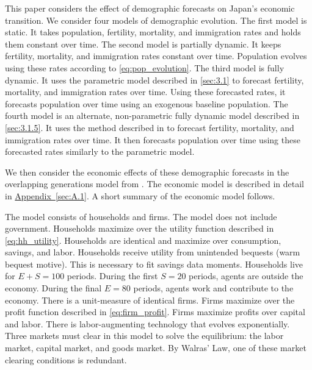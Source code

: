 \documentclass[10pt]{article}
\renewcommand{\thesection}{\arabic{section}}
\renewcommand{\thesubsection}{\thesection.\arabic{subsection}}
\newcommand{\aref}[1]{\hyperref[#1]{Appendix~\ref{#1}}}
\renewcommand{\subsection}[2][]{\oldsubsection[#1]{#2}\index{#1}\label{sec:\thesubsection}}
\numberwithin{equation}{subsection}
\begin{document}
\par This paper considers the effect of demographic forecasts on Japan's economic transition. We consider four models of demographic evolution. The first model is static. It takes population, fertility, mortality, and immigration rates and holds them constant over time. The second model is partially dynamic. It keeps fertility, mortality, and immigration rates constant over time. Population evolves using these rates according to \ref{eq:pop_evolution}. The third model is fully dynamic. It uses the parametric model described in \autoref{sec:3.1} to forecast fertility, mortality, and immigration rates over time. Using these forecasted rates, it forecasts population over time using an exogenous baseline population. The fourth model is an alternate, non-parametric fully dynamic model described in \autoref{sec:3.1.5}. It uses the method described in \cite{alt_demo_paper} to forecast fertility, mortality, and immigration rates over time. It then forecasts population over time using these forecasted rates similarly to the parametric model.

\par We then consider the economic effects of these demographic forecasts in the overlapping generations model from \cite{E2020}. The economic model is described in detail in \aref{sec:A.1}. A short summary of the economic model follows.

\par The model consists of households and firms. The model does not include government. Households maximize over the utility function described in \ref{eq:hh_utility}. Households are identical and maximize over consumption, savings, and labor. Households receive utility from unintended bequests (warm bequest motive). This is necessary to fit savings data moments. Households live for \(E+S=100\) periods. During the first \(S=20\) periods, agents are outside the economy. During the final \(E=80\) periods, agents work and contribute to the economy. There is a unit-measure of identical firms. Firms maximize over the profit function described in \ref{eq:firm_profit}. Firms maximize profits over capital and labor. There is labor-augmenting technology that evolves exponentially. Three markets must clear in this model to solve the equilibrium: the labor market, capital market, and goods market. By Walras' Law, one of these market clearing conditions is redundant.

\end{document}
